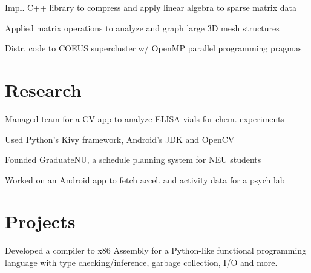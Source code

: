 \documentclass[letterpaper]{resume} %
\begin{document}
\begin{minipage}[t]{0.66\textwidth}
\sectionspace %

\begin{tightitemize}
  \item Impl. C++ library to compress and apply linear algebra to sparse matrix data
  \item Applied matrix operations to analyze and graph large 3D mesh structures
  \item Distr. code to COEUS supercluster w/ OpenMP parallel programming pragmas
\end{tightitemize}


\section{Research}


\begin{tightitemize}
  \item Managed team for a CV app to analyze ELISA vials for chem. experiments
  \item Used Python's Kivy framework, Android's JDK and OpenCV
  \item Founded GraduateNU, a schedule planning system for NEU students
  \item Worked on an Android app to fetch accel. and activity data for a psych lab
\end{tightitemize}


\section{Projects}

Developed a compiler to x86 Assembly for a Python-like
functional programming language with type checking/inference,
garbage collection, I/O and more.
\sectionspace


\end{minipage}
\end{document}
